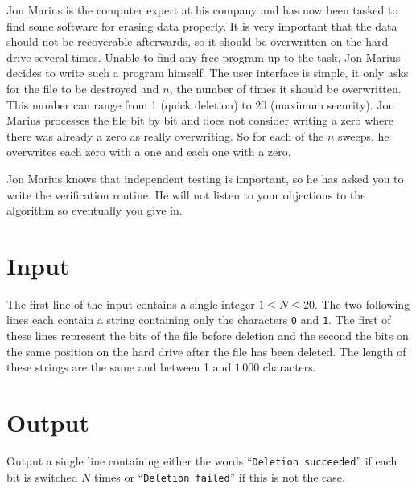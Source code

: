 

Jon Marius is the computer expert at his company and has now been tasked to find some software for erasing data properly. It is very important that the data should not be recoverable afterwards, so it should be overwritten on the hard drive several times. Unable to find any free program up to the task, Jon Marius decides to write such a program himself. The user interface is simple, it only asks for the file to be destroyed and $n$, the number of times it should be overwritten. This number can range from 1 (quick deletion) to 20 (maximum security). Jon Marius processes the file bit by bit and does not consider writing a zero where there was already a zero as really overwriting. So for each of the $n$ sweeps, he overwrites each zero with a one and each one with a zero.

Jon Marius knows that independent testing is important, so he has asked you to write the verification routine. He will not listen to your objections to the algorithm so eventually you give in.

\section*{Input}

The first line of the input contains a single integer $1 \leq N \leq 20$. The two following lines
each contain a string containing only the characters {\tt 0} and {\tt 1}. The first of these lines
represent the bits of the file before deletion and the second the bits on the same position on the
hard drive after the file has been deleted. The length of these strings are the same and between 1
and $1\,000$ characters.

\section*{Output}

Output a single line containing either the words ``{\tt Deletion succeeded}'' if each bit is switched $N$ times or ``{\tt Deletion failed}'' if this is not the case.

